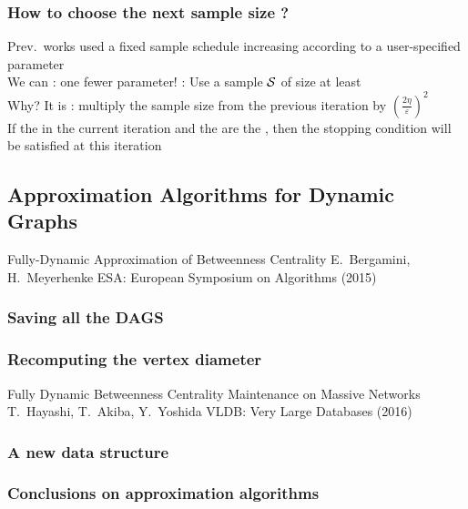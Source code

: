 \begin{frame}
  \frametitle{How to choose the next sample size ?}
  Prev.~works used a fixed sample schedule increasing according to a user-specified parameter\\
  \quad We can : one fewer parameter!
  \vfill
  : Use a sample ${\cal S}$ of size at least
  \\
  \quad Why? It is 
  \vfill
  : multiply the sample size from the previous
  iteration by $\displaystyle\left(\frac{2\eta}{\varepsilon}\right)^2$\\
   If the  in the current iteration
  and the  are the , then the stopping condition will be satisfied at this iteration
\end{frame}

\subsection{Approximation Algorithms for Dynamic Graphs}

\begin{frame}
  \centering
  \vfill
  {\huge Fully-Dynamic Approximation of Betweenness Centrality}
  \vfill
  {\Large E.~Bergamini, H.~Meyerhenke}
  \vfill
  {\large ESA: European Symposium on Algorithms (2015)}
  \vfill
\end{frame}

\begin{frame}
  \frametitle{Saving all the DAGS}
\end{frame}

\begin{frame}
  \frametitle{Recomputing the vertex diameter}
\end{frame}

\begin{frame}
  \centering
  \vfill
  {\huge Fully Dynamic Betweenness Centrality Maintenance on Massive
  Networks}
  \vfill
  {\Large T.~Hayashi, T.~Akiba, Y.~Yoshida}
  \vfill
  {\large VLDB: Very Large Databases (2016)}
  \vfill
\end{frame}

\begin{frame}
  \frametitle{A new data structure}
\end{frame}

\begin{frame}
  \frametitle{Conclusions on approximation algorithms}
\end{frame}

